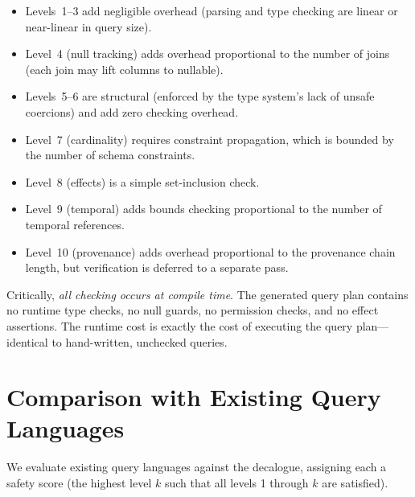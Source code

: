 \documentclass[11pt,a4paper]{article}
\begin{document}
\begin{itemize}[nosep]
  \item Levels~1--3 add negligible overhead (parsing and type checking
    are linear or near-linear in query size).
  \item Level~4 (null tracking) adds overhead proportional to the
    number of joins (each join may lift columns to nullable).
  \item Levels~5--6 are structural (enforced by the type system's
    lack of unsafe coercions) and add zero checking overhead.
  \item Level~7 (cardinality) requires constraint propagation, which
    is bounded by the number of schema constraints.
  \item Level~8 (effects) is a simple set-inclusion check.
  \item Level~9 (temporal) adds bounds checking proportional to the
    number of temporal references.
  \item Level~10 (provenance) adds overhead proportional to the
    provenance chain length, but verification is deferred to a
    separate pass.
\end{itemize}

Critically, \emph{all checking occurs at compile time}.  The generated
query plan contains no runtime type checks, no null guards, no
permission checks, and no effect assertions.  The runtime cost is
exactly the cost of executing the query plan---identical to hand-written,
unchecked queries.

\section{Comparison with Existing Query Languages}\label{sec:comparison}

We evaluate existing query languages against the decalogue, assigning
each a safety score (the highest level $k$ such that all levels
1 through $k$ are satisfied).
\end{document}
